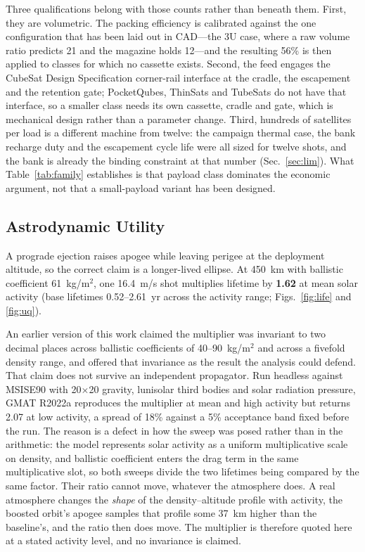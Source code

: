 \documentclass[conference]{IEEEtran}
\begin{document}
Three qualifications belong with those counts rather than beneath them. First, they are volumetric. The packing efficiency is calibrated against the one configuration that has been laid out in CAD---the 3U case, where a raw volume ratio predicts 21 and the magazine holds 12---and the resulting 56\% is then applied to classes for which no cassette exists. Second, the feed engages the CubeSat Design Specification corner-rail interface at the cradle, the escapement and the retention gate; PocketQubes, ThinSats and TubeSats do not have that interface, so a smaller class needs its own cassette, cradle and gate, which is mechanical design rather than a parameter change. Third, hundreds of satellites per load is a different machine from twelve: the campaign thermal case, the bank recharge duty and the escapement cycle life were all sized for twelve shots, and the bank is already the binding constraint at that number (Sec.~\ref{sec:lim}). What Table~\ref{tab:family} establishes is that payload class dominates the economic argument, not that a small-payload variant has been designed.

\subsection{Astrodynamic Utility}
A prograde ejection raises apogee while leaving perigee at the deployment altitude, so the correct claim is a longer-lived ellipse. At 450~km with ballistic coefficient 61~kg/m$^2$, one 16.4~m/s shot multiplies lifetime by \textbf{1.62} at mean solar activity (base lifetimes 0.52--2.61~yr across the activity range; Figs.~\ref{fig:life} and \ref{fig:uq}).

An earlier version of this work claimed the multiplier was invariant to two decimal places across ballistic coefficients of 40--90~kg/m$^2$ and across a fivefold density range, and offered that invariance as the result the analysis could defend. That claim does not survive an independent propagator. Run headless against MSISE90 with 20$\times$20 gravity, lunisolar third bodies and solar radiation pressure, GMAT R2022a reproduces the multiplier at mean and high activity but returns 2.07 at low activity, a spread of 18\% against a 5\% acceptance band fixed before the run. The reason is a defect in how the sweep was posed rather than in the arithmetic: the model represents solar activity as a uniform multiplicative scale on density, and ballistic coefficient enters the drag term in the same multiplicative slot, so both sweeps divide the two lifetimes being compared by the same factor. Their ratio cannot move, whatever the atmosphere does. A real atmosphere changes the \emph{shape} of the density--altitude profile with activity, the boosted orbit's apogee samples that profile some 37~km higher than the baseline's, and the ratio then does move. The multiplier is therefore quoted here at a stated activity level, and no invariance is claimed.
\end{document}
